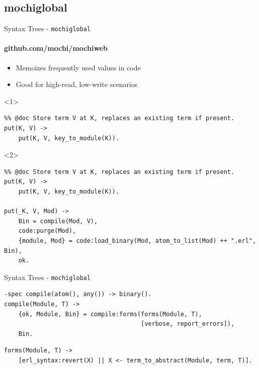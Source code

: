 \documentclass[c]{beamer}
\begin{document}
\subsection{mochiglobal}
\begin{frame}[fragile,t]{Syntax Trees - \texttt{mochiglobal}}
  \framesubtitle{github.com/mochi/mochiweb}
  \begin{itemize}
  \item Memoizes frequently used values in code
  \item Good for high-read, low-write scenarios
  \end{itemize}

  \begin{onlyenv}<1>
  \begin{lstlisting}
%% @doc Store term V at K, replaces an existing term if present.
put(K, V) ->
    put(K, V, key_to_module(K)).
  \end{lstlisting}
  \end{onlyenv}

  \begin{onlyenv}<2>
  \begin{lstlisting}
%% @doc Store term V at K, replaces an existing term if present.
put(K, V) ->
    put(K, V, key_to_module(K)).

put(_K, V, Mod) ->
    Bin = compile(Mod, V),
    code:purge(Mod),
    {module, Mod} = code:load_binary(Mod, atom_to_list(Mod) ++ ".erl", Bin),
    ok.
  \end{lstlisting}
  \end{onlyenv}
\end{frame}

\begin{frame}[fragile]{Syntax Trees - \texttt{mochiglobal}}

\begin{lstlisting}
-spec compile(atom(), any()) -> binary().
compile(Module, T) ->
    {ok, Module, Bin} = compile:forms(forms(Module, T),
                                      [verbose, report_errors]),
    Bin.
\end{lstlisting}
\pause
\begin{lstlisting}
forms(Module, T) ->
    [erl_syntax:revert(X) || X <- term_to_abstract(Module, term, T)].
\end{lstlisting}
\end{frame}
\end{document}
